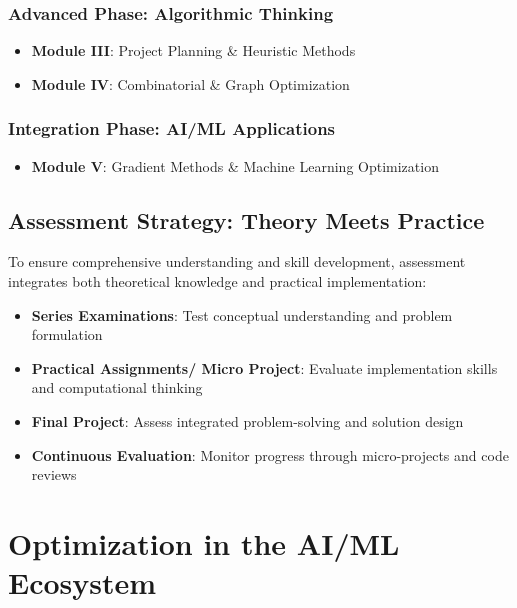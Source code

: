 \documentclass[
  letterpaper,
  DIV=11,
  numbers=noendperiod]{scrreprt}
\providecommand{\tightlist}{%
  \setlength{\itemsep}{0pt}\setlength{\parskip}{0pt}}
\begin{document}
\subsubsection{Advanced Phase: Algorithmic
Thinking}\label{advanced-phase-algorithmic-thinking}

\begin{itemize}
\tightlist
\item
  \textbf{Module III}: Project Planning \& Heuristic Methods
\item
  \textbf{Module IV}: Combinatorial \& Graph Optimization
\end{itemize}

\subsubsection{Integration Phase: AI/ML
Applications}\label{integration-phase-aiml-applications}

\begin{itemize}
\tightlist
\item
  \textbf{Module V}: Gradient Methods \& Machine Learning Optimization
\end{itemize}

\subsection{Assessment Strategy: Theory Meets
Practice}\label{assessment-strategy-theory-meets-practice}

To ensure comprehensive understanding and skill development, assessment
integrates both theoretical knowledge and practical implementation:

\begin{itemize}
\tightlist
\item
  \textbf{Series Examinations}: Test conceptual understanding and
  problem formulation
\item
  \textbf{Practical Assignments/ Micro Project}: Evaluate implementation
  skills and computational thinking\\
\item
  \textbf{Final Project}: Assess integrated problem-solving and solution
  design
\item
  \textbf{Continuous Evaluation}: Monitor progress through
  micro-projects and code reviews
\end{itemize}

\section{Optimization in the AI/ML
Ecosystem}\label{optimization-in-the-aiml-ecosystem}
\end{document}
